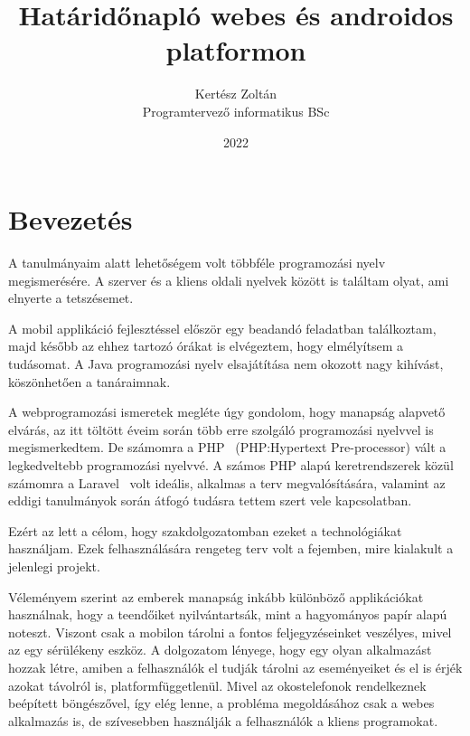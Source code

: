 \documentclass[
]{thesis-ekf}
\theoremstyle{definition}
\theoremstyle{remark}
\begin{document}
	\title{Határidőnapló webes és androidos platformon}
	\author{Kertész Zoltán\\Programtervező informatikus BSc}
	\date{2022}
	\maketitle
	\tableofcontents
	
	\chapter*{Bevezetés}
	A tanulmányaim alatt lehetőségem volt többféle programozási nyelv megismerésére. A szerver és a kliens oldali nyelvek között is találtam olyat, ami elnyerte a tetszésemet. 
	
	A mobil applikáció fejlesztéssel először egy beadandó feladatban találkoztam, majd később az ehhez tartozó órákat is elvégeztem, hogy elmélyítsem a tudásomat. A Java programozási nyelv elsajátítása nem okozott nagy kihívást, köszönhetően a tanáraimnak. 
	
	A webprogramozási ismeretek megléte úgy gondolom, hogy manapság alapvető elvárás, az itt töltött éveim során több erre szolgáló programozási nyelvvel is megismerkedtem. De számomra a PHP~\cite{php_doc} (PHP:Hypertext Pre-processor) vált a legkedveltebb programozási nyelvvé. A számos PHP alapú keretrendszerek közül számomra a Laravel~\cite{laravel_main} volt ideális, alkalmas a terv megvalósítására, valamint az eddigi tanulmányok során átfogó tudásra tettem szert vele kapcsolatban.
	
	Ezért az lett a célom, hogy szakdolgozatomban ezeket a technológiákat használjam. Ezek felhasználására rengeteg terv volt a fejemben, mire kialakult a jelenlegi projekt.
	
	Véleményem szerint az emberek manapság inkább különböző applikációkat használnak, hogy a teendőiket nyilvántartsák, mint a hagyományos papír alapú noteszt. Viszont csak a mobilon tárolni a fontos feljegyzéseinket veszélyes, mivel az egy sérülékeny eszköz. A dolgozatom lényege, hogy egy olyan alkalmazást hozzak létre, amiben a felhasználók el tudják tárolni az eseményeiket és el is érjék azokat távolról is, platformfüggetlenül. Mivel az okostelefonok rendelkeznek beépített böngészővel, így elég lenne, a probléma megoldásához csak a webes alkalmazás is, de szívesebben használják a felhasználók a kliens programokat. 
	
\end{document}
